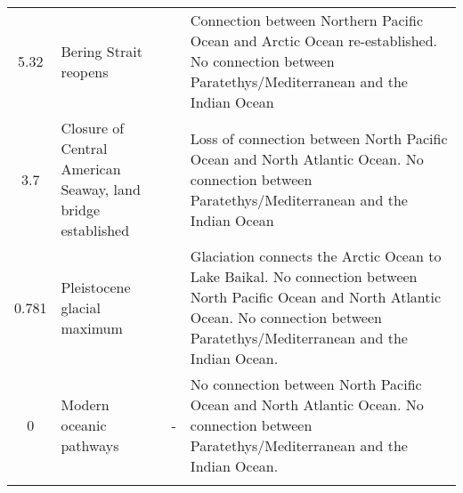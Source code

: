 \begin{longtable}{cp{}p{}p{}}
5.32 &
Bering Strait reopens &
\cite{gladenkov2002refined} &
Connection between Northern Pacific Ocean and Arctic Ocean re-established. No connection between Paratethys/Mediterranean and the Indian Ocean\\
3.7 &
Closure of Central American Seaway, land bridge established &
\cite{duque1990neogene} &
Loss of connection between North Pacific Ocean and North Atlantic Ocean. No connection between  Paratethys/Mediterranean and the Indian Ocean \\
0.781 &
Pleistocene glacial maximum &
\cite{ehlers2007extent} &
Glaciation connects the Arctic Ocean to Lake Baikal. No connection between North Pacific Ocean and North Atlantic Ocean. No connection between Paratethys/Mediterranean and the Indian Ocean. \\
0 &
Modern oceanic pathways &
- &
No connection between North Pacific Ocean and North Atlantic Ocean. No connection between  Paratethys/Mediterranean and the Indian Ocean.\\
\hline

\label{table-pathways}
\end{longtable}